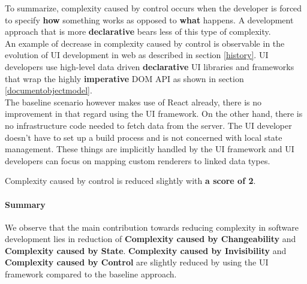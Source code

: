To summarize, complexity caused by control occurs when the developer is forced to specify \textbf{how} something works as opposed to \textbf{what} happens. A development approach that is more \textbf{declarative} bears less of this type of complexity. \\
An example of decrease in complexity caused by control is observable in the evolution of UI development in web as described in section \ref{history}. UI developers use high-level data driven \textbf{declarative} UI libraries and frameworks that wrap the highly \textbf{imperative} DOM API as shown in section \ref{documentobjectmodel}. \\
The baseline scenario however makes use of React already, there is no improvement in that regard using the UI framework. On the other hand, there is no infrastructure code needed to fetch data from the server. The UI developer doesn't have to set up a build process and is not concerned with local state management. These things are implicitly handled by the UI framework and UI developers can focus on mapping custom renderers to linked data types.

Complexity caused by control is reduced slightly with \textbf{a score of 2}.

\paragraph{Summary}
We observe that the main contribution towards reducing complexity in software development lies in reduction of \textbf{Complexity caused by Changeability} and \textbf{Complexity caused by State}. \textbf{Complexity caused by Invisibility} and \textbf{Complexity caused by Control} are slightly reduced by using the UI framework compared to the baseline approach.
